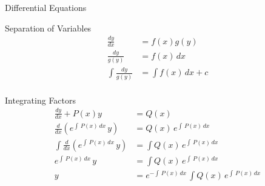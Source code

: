 %
%

\begin{section}{Differential Equations}
  \begin{subsection}{Separation of Variables}
    \begin{align*}
      \frac{dy}{dx} &= f(x)g(y) \\
      \frac{dy}{g(y)} &= f(x)\,dx \\
      \int{\frac{dy}{g(y)}} &= \int{f(x)}\,dx+c \\
    \end{align*}
  \end{subsection}
  \begin{subsection}{Integrating Factors}
    \begin{align*}
      \frac{dy}{dx} + P(x)y &= Q(x) \\
      \frac{d}{dx}(e^{\int\,P(x)\,dx}\,y) &= Q(x)\,e^{\int\,P(x)\,dx} \\
      \int{\frac{d}{dx}(e^{\int\,P(x)\,dx}\,y)} &= \int{Q(x)\,e^{\int\,P(x)\,dx}} \\
      e^{\int\,P(x)\,dx}\,y &= \int{Q(x)\,e^{\int\,P(x)\,dx}} \\
      y &= e^{-\int\,P(x)\,dx}\,\int{Q(x)\,e^{\int\,P(x)\,dx}} \\
    \end{align*}
  \end{subsection}
\end{section}
